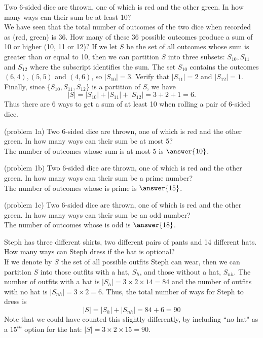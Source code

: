 \documentclass[handout]{ximera}
\begin{document}
\begin{example}[example 1]
Two 6-sided dice are thrown, one of which is red and the other green.  
In how many ways can their sum be at least 10?\\
We have seen that the total number of outcomes of the two dice when 
recorded as (red, green) is 36. How many of these 36 possible outcomes produce a 
sum of 10 or higher (10, 11 or 12)? 
If we let $S$ be the set of all outcomes whose sum is greater than 
or equal to 10, then we can partition $S$ into three 
subsets: $S_{10}, S_{11}$ and $S_{12}$
where the subscript identifies the sum. 
The set $S_{10}$ contains the outcomes $(6,4), (5,5)$ and $(4,6)$, 
so $|S_{10}| =3$. Verify that $|S_{11}| =2$ and $|S_{12}| =1$.\\
Finally, since $\{S_{10}, S_{11}, S_{12}\}$ is a partition of $S$, we have
\[
|S| = |S_{10}| +|S_{11}| +|S_{12}| = 3 + 2 + 1 = 6.
\]
Thus there are 6 ways to get a sum of at least 10 when rolling a pair of 6-sided dice.
\end{example}

\begin{problem}(problem 1a)
Two 6-sided dice are thrown, one of which is red and the other green.  
In how many ways can their sum be at most 5?\\
The number of outcomes whose sum is at most 5 is $\answer{10}$.
\end{problem}

\begin{problem}(problem 1b)
Two 6-sided dice are thrown, one of which is red and the other green.  
In how many ways can their sum be a prime number?\\
The number of outcomes whose is prime is $\answer{15}$.
\end{problem}

\begin{problem}(problem 1c)
Two 6-sided dice are thrown, one of which is red and the other green.  
In how many ways can their sum be an odd number?\\
The number of outcomes whose is odd is $\answer{18}$.
\end{problem}


\begin{example}[example 2] Steph has three different shirts, 
two different pairs of pants and 14 different hats. 
How many ways can Steph dress if the hat is optional?\\
If we denote by $S$ the set of all possible outfits Steph can wear, 
then we can partition $S$ into those outfits with a hat, $S_h$, 
and those without a hat, $S_{nh}$.
The number of outfits with a hat is $|S_h| = 3 \times 2 \times 14 = 84$ and 
the number of outfits with no hat is $|S_{nh}| = 3\times 2 = 6$. 
Thus, the total number of ways for Steph to dress is 
\[
|S| = |S_h| + |S_{nh}| = 84 + 6 = 90
\]
Note that we could have counted this slightly 
differently, by including ``no hat" as a $15^{th}$ option 
for the hat: $|S| = 3 \times 2 \times 15 = 90$.
\end{example}
\end{document}
